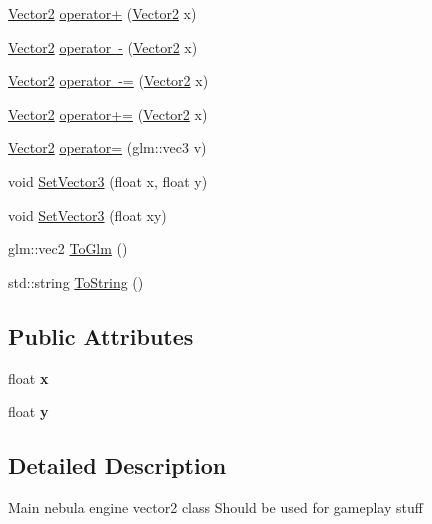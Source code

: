 \begin{DoxyCompactItemize}
\item 
\mbox{\hyperlink{struct_vector2}{Vector2}} \mbox{\hyperlink{struct_vector2_a2a517dda544bc45e6e06dd4ea983c5d7}{operator+}} (\mbox{\hyperlink{struct_vector2}{Vector2}} x)
\item 
\mbox{\hyperlink{struct_vector2}{Vector2}} \mbox{\hyperlink{struct_vector2_accce68ad818627dbe189c9e946aa1c80}{operator -\/}} (\mbox{\hyperlink{struct_vector2}{Vector2}} x)
\item 
\mbox{\hyperlink{struct_vector2}{Vector2}} \mbox{\hyperlink{struct_vector2_affe953e6b1098456324e4fdea72ec8e4}{operator -\/=}} (\mbox{\hyperlink{struct_vector2}{Vector2}} x)
\item 
\mbox{\hyperlink{struct_vector2}{Vector2}} \mbox{\hyperlink{struct_vector2_a7ed76b87b79c2a20b08788328dcf592e}{operator+=}} (\mbox{\hyperlink{struct_vector2}{Vector2}} x)
\item 
\mbox{\hyperlink{struct_vector2}{Vector2}} \mbox{\hyperlink{struct_vector2_a6baf5cab131f85f846b784ad31c506ec}{operator=}} (glm\+::vec3 v)
\item 
void \mbox{\hyperlink{struct_vector2_a0c002bc16739ff7533526a38e18226a0}{Set\+Vector3}} (float x, float y)
\item 
void \mbox{\hyperlink{struct_vector2_af2880756375df5f0f70aec09efbbc77e}{Set\+Vector3}} (float xy)
\item 
glm\+::vec2 \mbox{\hyperlink{struct_vector2_adc634be04f1bf7f1a91811216ea6ac50}{To\+Glm}} ()
\item 
std\+::string \mbox{\hyperlink{struct_vector2_a5954390e62401baa0d28d5b2128845fa}{To\+String}} ()
\end{DoxyCompactItemize}
\subsection*{Public Attributes}
\begin{DoxyCompactItemize}
\item 
\mbox{\label{struct_vector2_a046bb8d17a876acc49415128dc0502f2}} 
float {\bfseries x}
\item 
\mbox{\label{struct_vector2_a0e07bad05f01ed811b909a2eef97f9e2}} 
float {\bfseries y}
\end{DoxyCompactItemize}


\subsection{Detailed Description}
Main nebula engine vector2 class Should be used for gameplay stuff 

